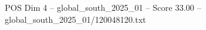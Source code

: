 \begin{textsample}{POS Dim 4 – global\_south\_2025\_01 – Score 33.00 – global\_south\_2025\_01/120048120.txt}
\end{textsample}
